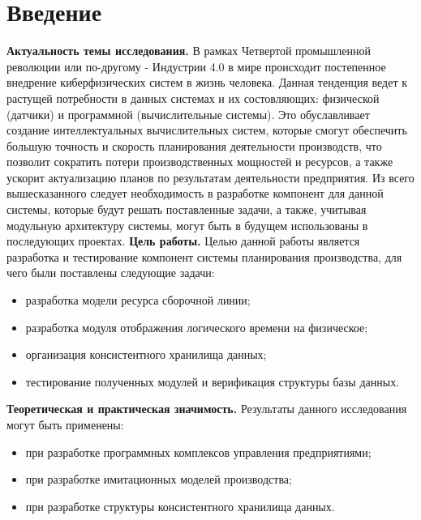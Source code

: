 \section*{Введение}
\indent \textbf{Актуальность темы исследования.}
В рамках Четвертой промышленной революции или по-другому - Индустрии 4.0 в мире происходит постепенное внедрение киберфизических систем в жизнь человека.
Данная тенденция ведет к растущей потребности в данных системах и их состовляющих: физической (датчики) и программной (вычислительные системы).
Это обуславливает создание интеллектуальных вычислительных систем, которые смогут обеспечить большую точность и скорость планирования деятельности производств, что позволит сократить потери производственных мощностей и ресурсов, а также ускорит актуализацию планов по результатам деятельности предприятия.
Из всего вышесказанного следует необходимость в разработке компонент для данной системы, которые будут решать поставленные задачи, а также, учитывая модульную архитектуру системы, могут быть в будущем использованы в последующих проектах.
\indent \textbf{Цель работы.} 
Целью данной работы является разработка и тестирование компонент системы планирования производства, для чего были поставлены следующие задачи:
\begin{itemize}
	\item разработка модели ресурса сборочной линии;
	\item разработка модуля отображения логического времени на физическое;
	\item организация консистентного хранилища данных;
	\item тестирование полученных модулей и верификация структуры базы данных.
\end{itemize}

\indent \textbf{Теоретическая и практическая значимость.}
Результаты данного исследования могут быть применены:
\begin{itemize}
	\item при разработке программных комплексов управления предприятиями;
	\item при разработке имитационных моделей производства;
	\item при разработке структуры консистентного хранилища данных.
\end{itemize}

